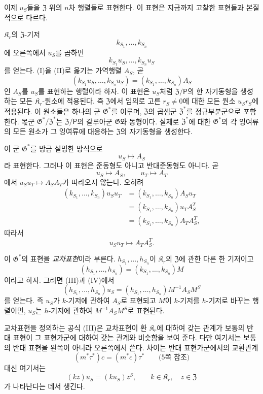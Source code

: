 이제 \(u_S\)들을 \(\mathfrak Z\) 위의 \(n\)차 행렬들로 표현한다. 이 표현은 지금까지 고찰한 표현들과 본질적으로 다르다.

\(\mathfrak K_r\)의 \(\mathfrak Z\)-기저
\[
\tag{I}
        k_{S_1},\ldots,k_{S_n}
\]
에 오른쪽에서 \(u_S\)를 곱하면
\[
\tag{II}
        k_{S_1}u_S,\ldots,k_{S_n}u_S
\]
를 얻는다. (I)을 (II)로 옮기는 가역행렬 \(A_S\), 곧
\[
\tag{III}
        (k_{S_1}u_S,\ldots,k_{S_n}u_S)
        =(k_{S_1},\ldots,k_{S_n})A_S
\]
인 \(A_S\)를 \(u_S\)를 표현하는 행렬이라 하자. 이 표현은 \(u_S\)처럼 \(\mathfrak Z/\mathsf P\)의 한 자기동형을 생성하는 모든 \(\mathfrak K_r\)-원소에 적용된다. 즉 \(\mathfrak Z\)에서 임의로 고른 \(r_S\ne0\)에 대한 모든 원소 \(u_Sr_S\)에 적용된다. 이 원소들은 하나의 군 \(\mathfrak G^*\)를 이루며, \(\mathfrak Z\)의 곱셈군 \(\mathfrak Z^*\)를 정규부분군으로 포함한다. 몫군 \(\mathfrak G^*/\mathfrak Z^*\)는 \(\mathfrak Z/\mathsf P\)의 갈루아군 \(\mathfrak G\)와 동형이다. 실제로 \(\mathfrak Z^*\)에 대한 \(\mathfrak G^*\)의 각 잉여류의 모든 원소가 그 잉여류에 대응하는 \(\mathfrak Z\)의 자기동형을 생성한다.

이 군 \(\mathfrak G^*\)를 방금 설명한 방식으로
\[
        u_S\longmapsto A_S
\]
라 표현한다. 그러나 이 표현은 준동형도 아니고 반대준동형도 아니다. 곧
\[
        u_S\longmapsto A_S,
        \qquad
        u_T\longmapsto A_T
\]
에서 \(u_Su_T\mapsto A_SA_T\)가 따라오지 않는다. 오히려
\[
\begin{aligned}
(k_{S_1},\ldots,k_{S_n})u_Su_T
 &=(k_{S_1},\ldots,k_{S_n})A_Su_T\\
 &=(k_{S_1},\ldots,k_{S_n})u_TA_S^T\\
 &=(k_{S_1},\ldots,k_{S_n})A_TA_S^T,
\end{aligned}
\]
따라서
\[
        u_Su_T\longmapsto A_TA_S^T.
\]

이 \(\mathfrak G^*\)의 표현을 \emph{교차표현}이라 부른다. \(h_{S_1},\ldots,h_{S_n}\)이 \(\mathfrak K_r\)의 \(\mathfrak Z\)에 관한 다른 한 기저이고
\[
\tag{IV}
        (h_{S_1},\ldots,h_{S_n})
        =(k_{S_1},\ldots,k_{S_n})M
\]
이라고 하자. 그러면 (III)과 (IV)에서
\[
        (h_{S_1},\ldots,h_{S_n})u_S
        =(h_{S_1},\ldots,h_{S_n})M^{-1}A_SM^S
\]
를 얻는다. 즉 \(u_S\)가 \(k\)-기저에 관하여 \(A_S\)로 표현되고 \(M\)이 \(k\)-기저를 \(h\)-기저로 바꾸는 행렬이면, \(u_S\)는 \(h\)-기저에 관하여 \(M^{-1}A_SM^S\)로 표현된다.

교차표현을 정의하는 공식 (III)은 교차표현이 환 \(\mathfrak K_r\)에 대하여 갖는 관계가 보통의 반대 표현이 그 표현가군에 대하여 갖는 관계와 비슷함을 보여 준다. 다만 여기서는 보통의 반대 표현을 왼쪽이 아니라 오른쪽에서 쓴다. 차이는 반대 표현가군에서의 교환관계
\[
        (m^*\tau^*)c=(m^*c)\tau^*
        \qquad\text{(5쪽 참조)}
\]
대신 여기서는
\[
        (kz)u_S=(ku_S)z^S,
        \qquad
        k\in\mathfrak K_r,
        \quad
        z\in\mathfrak Z
\]
가 나타난다는 데서 생긴다.

